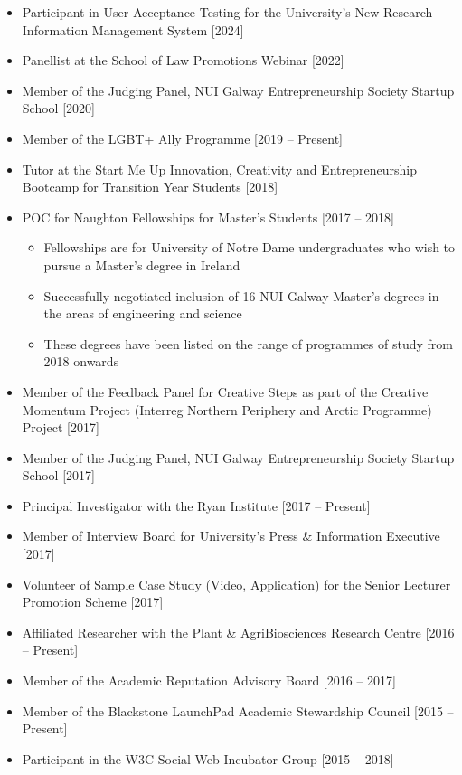 \documentclass[10pt,a4paper]{res} %
\begin{document}
\begin{resume}
\begin{itemize} \itemsep -2pt
\item Participant in User Acceptance Testing for the University's New Research Information Management System [2024]
\item Panellist at the School of Law Promotions Webinar [2022]
\item Member of the Judging Panel, NUI Galway Entrepreneurship Society Startup School [2020]
\item Member of the LGBT+ Ally Programme [2019 -- Present]
\item Tutor at the Start Me Up Innovation, Creativity and Entrepreneurship Bootcamp for Transition Year Students [2018]
\item POC for Naughton Fellowships for Master's Students [2017 -- 2018]
\begin{itemize} \itemsep -2pt
\item Fellowships are for University of Notre Dame undergraduates who wish to pursue a Master's degree in Ireland
\item Successfully negotiated inclusion of 16 NUI Galway Master's degrees in the areas of engineering and science
\item These degrees have been listed on the range of programmes of study from 2018 onwards
\end{itemize}
\item Member of the Feedback Panel for Creative Steps as part of the Creative Momentum Project (Interreg Northern Periphery and Arctic Programme) Project [2017]
\item Member of the Judging Panel, NUI Galway Entrepreneurship Society Startup School [2017]
\item Principal Investigator with the Ryan Institute [2017 -- Present]
\item Member of Interview Board for University's Press \& Information Executive [2017]
\item Volunteer of Sample Case Study (Video, Application) for the Senior Lecturer Promotion Scheme [2017]
\item Affiliated Researcher with the Plant \& AgriBiosciences Research Centre [2016 -- Present]
\item Member of the Academic Reputation Advisory Board [2016 -- 2017]
\item Member of the Blackstone LaunchPad Academic Stewardship Council [2015 -- Present]
\item Participant in the W3C Social Web Incubator Group [2015 -- 2018]

\end{itemize}
\end{resume}
\end{document}
